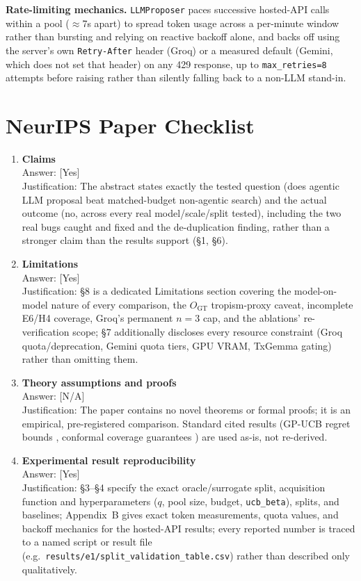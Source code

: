 \documentclass{article}
\begin{document}
\textbf{Rate-limiting mechanics.} \texttt{LLMProposer} paces successive hosted-API calls within a
pool ($\approx$7s apart) to spread token usage across a per-minute window rather than bursting and
relying on reactive backoff alone, and backs off using the server's own \texttt{Retry-After}
header (Groq) or a measured default (Gemini, which does not set that header) on any 429 response,
up to \texttt{max\_retries=8} attempts before raising rather than silently falling back to a
non-LLM stand-in.

\section{NeurIPS Paper Checklist}

\begin{enumerate}

\item \textbf{Claims}\\
Answer: [Yes]\\
Justification: The abstract states exactly the tested question (does agentic LLM proposal beat
matched-budget non-agentic search) and the actual outcome (no, across every real model/scale/split
tested), including the two real bugs caught and fixed and the de-duplication finding, rather than a
stronger claim than the results support (\S1, \S6).

\item \textbf{Limitations}\\
Answer: [Yes]\\
Justification: \S8 is a dedicated Limitations section covering the model-on-model nature of every
comparison, the $O_{\text{GT}}$ tropism-proxy caveat, incomplete E6/H4 coverage, Groq's permanent
$n=3$ cap, and the ablations' re-verification scope; \S7 additionally discloses every resource
constraint (Groq quota/deprecation, Gemini quota tiers, GPU VRAM, TxGemma gating) rather than
omitting them.

\item \textbf{Theory assumptions and proofs}\\
Answer: [N/A]\\
Justification: The paper contains no novel theorems or formal proofs; it is an empirical,
pre-registered comparison. Standard cited results (GP-UCB regret bounds \citep{srinivas2009},
conformal coverage guarantees \citep{angelopoulos2023}) are used as-is, not re-derived.

\item \textbf{Experimental result reproducibility}\\
Answer: [Yes]\\
Justification: \S3--\S4 specify the exact oracle/surrogate split, acquisition function and
hyperparameters ($q$, pool size, budget, \texttt{ucb\_beta}), splits, and baselines; Appendix~B
gives exact token measurements, quota values, and backoff mechanics for the hosted-API results;
every reported number is traced to a named script or result file (e.g.\
\texttt{results/e1/split\_validation\_table.csv}) rather than described only qualitatively.


\end{enumerate}
\end{document}
